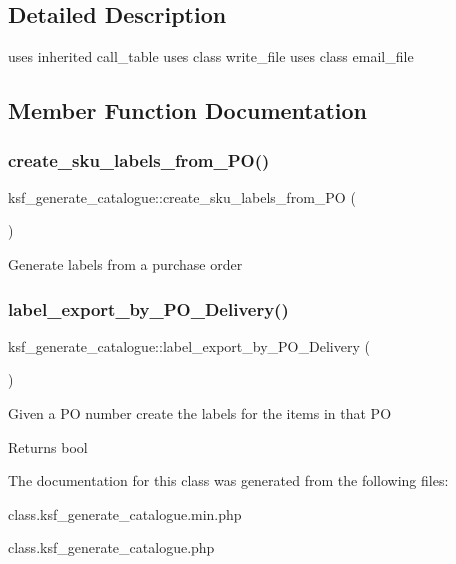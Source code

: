 \subsection{Detailed Description}
uses inherited call\+\_\+table uses class write\+\_\+file uses class email\+\_\+file 

\subsection{Member Function Documentation}
\hypertarget{classksf__generate__catalogue_a4a0e6c124aeb3ecc1078183b462f74d2}{}\label{classksf__generate__catalogue_a4a0e6c124aeb3ecc1078183b462f74d2} 
\subsubsection{\texorpdfstring{create\+\_\+sku\+\_\+labels\+\_\+from\+\_\+\+P\+O()}{create\_sku\_labels\_from\_PO()}}
{\footnotesize\ttfamily ksf\+\_\+generate\+\_\+catalogue\+::create\+\_\+sku\+\_\+labels\+\_\+from\+\_\+\+PO (\begin{DoxyParamCaption}{ }\end{DoxyParamCaption})}

Generate labels from a purchase order \hypertarget{classksf__generate__catalogue_a23e86ab2d815a549d625fcf34df36003}{}\label{classksf__generate__catalogue_a23e86ab2d815a549d625fcf34df36003} 
\subsubsection{\texorpdfstring{label\+\_\+export\+\_\+by\+\_\+\+P\+O\+\_\+\+Delivery()}{label\_export\_by\_PO\_Delivery()}}
{\footnotesize\ttfamily ksf\+\_\+generate\+\_\+catalogue\+::label\+\_\+export\+\_\+by\+\_\+\+P\+O\+\_\+\+Delivery (\begin{DoxyParamCaption}{ }\end{DoxyParamCaption})}

Given a PO number create the labels for the items in that PO

\begin{DoxyReturn}{Returns}
bool 
\end{DoxyReturn}


The documentation for this class was generated from the following files\+:\begin{DoxyCompactItemize}
\item 
class.\+ksf\+\_\+generate\+\_\+catalogue.\+min.\+php\item 
class.\+ksf\+\_\+generate\+\_\+catalogue.\+php\end{DoxyCompactItemize}
